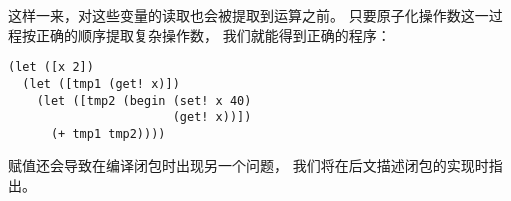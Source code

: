 这样一来，对这些变量的读取也会被提取到运算之前。
只要原子化操作数这一过程按正确的顺序提取复杂操作数，
我们就能得到正确的程序：

\begin{multilinecode}
\begin{lstlisting}
(let ([x 2])
  (let ([tmp1 (get! x)])
    (let ([tmp2 (begin (set! x 40)
                       (get! x))])
      (+ tmp1 tmp2))))
\end{lstlisting}
\end{multilinecode}

赋值还会导致在编译闭包时出现另一个问题，
我们将在后文描述闭包的实现时指出。
